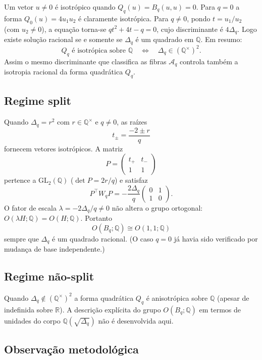 \documentclass[11pt,a4paper]{article}
\begin{document}
Um vetor \(u\neq0\) é isotrópico quando \(Q_q(u)=B_q(u,u)=0\). Para
\(q=0\) a forma \(Q_0(u)=4u_1u_2\) é claramente isotrópica. Para
\(q\neq0\), pondo \(t=u_1/u_2\) (com \(u_2\neq0\)), a equação torna-se
\(qt^2+4t-q=0\), cujo discriminante é \(4\Delta_q\). Logo existe solução
racional se e somente se \(\Delta_q\) é um quadrado em \(\mathbb{Q}\). Em
resumo:
\[
\boxed{
Q_q\text{ é isotrópica sobre }\mathbb{Q}
\quad\Longleftrightarrow\quad
\Delta_q\in(\mathbb{Q}^\times)^2.
}
\]
Assim o mesmo discriminante que classifica as fibras \(\mathcal{A}_q\)
controla também a isotropia racional da forma quadrática \(Q_q\).

\subsection{Regime split}

Quando \(\Delta_q=r^2\) com \(r\in\mathbb{Q}^\times\) e \(q\neq0\), as raízes
\[
t_\pm=\frac{-2\pm r}{q}
\]
fornecem vetores isotrópicos. A matriz
\[
P=\begin{pmatrix}t_+&t_-\\1&1\end{pmatrix}
\]
pertence a \(\mathrm{GL}_2(\mathbb{Q})\) (\(\det P=2r/q\)) e satisfaz
\[
P^\top W_q P
=
-\frac{2\Delta_q}{q}
\begin{pmatrix}0&1\\1&0\end{pmatrix}.
\]
O fator de escala \(\lambda=-2\Delta_q/q\neq0\) não altera o grupo
ortogonal: \(O(\lambda H;\mathbb{Q})=O(H;\mathbb{Q})\). Portanto
\[
\boxed{
O(B_q;\mathbb{Q})\cong O(1,1;\mathbb{Q})
}
\]
sempre que \(\Delta_q\) é um quadrado racional. (O caso \(q=0\) já havia
sido verificado por mudança de base independente.)

\subsection{Regime não-split}

Quando \(\Delta_q\notin(\mathbb{Q}^\times)^2\) a forma quadrática \(Q_q\) é
anisotrópica sobre \(\mathbb{Q}\) (apesar de indefinida sobre \(\mathbb{R}\)).
A descrição explícita do grupo \(O(B_q;\mathbb{Q})\) em termos de unidades
do corpo \(\mathbb{Q}(\sqrt{\Delta_q})\) não é desenvolvida aqui.

\subsection{Observação metodológica}
\end{document}
